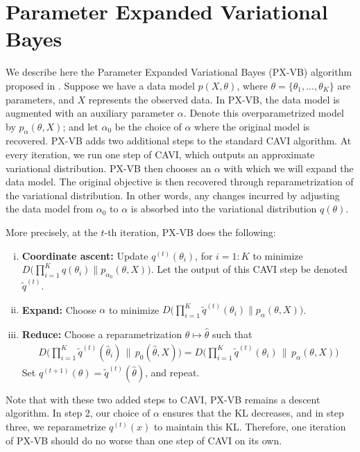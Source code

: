 \documentclass{article}
\begin{document}
\section{Parameter Expanded Variational Bayes}
\label{PXVB}

We describe here the Parameter Expanded Variational Bayes (PX-VB) algorithm proposed in \cite{Qi}. Suppose we have a data model $p(X,\theta)$, where $\theta =  \{\theta_1, ... , \theta_K\}$ are parameters, and $X$ represents the observed data. In PX-VB, the data model is augmented with an auxiliary parameter $\alpha$. Denote this overparametrized model by $p_\alpha(\theta, X)$; and let $\alpha_0$ be the choice of $\alpha$ where the original model is recovered. PX-VB adds two additional steps to the standard CAVI algorithm. At every iteration, we run one step of CAVI, which outputs an approximate variational distribution. PX-VB then chooses an $\alpha$ with which we will expand the data model. The original objective is then recovered through reparametrization of the variational distribution. In other words, any changes incurred by adjusting the data model from $\alpha_0$ to $\alpha$ is absorbed into the variational distribution $q(\theta)$. 



More precisely, at the $t$-th iteration, PX-VB does the following: 
\begin{enumerate}[(i)]
\item {\bf Coordinate ascent:} Update $q^{(t)}(\theta_i)$, for $i=1:K$ to minimize $D\big( \prod_{i=1}^K q(\theta_i) \| p_{\alpha_0}(\theta, X) \big)$. Let the output of this CAVI step be denoted $\tilde q^{(t)}$. 
\item {\bf Expand:} Choose $\alpha$ to minimize $D\big( \prod_{i=1}^K \tilde q^{(t)}(\theta_i) \| p_\alpha(\theta, X) \big)$.
\item {\bf Reduce:} Choose a reparametrization $\theta \mapsto \hat\theta$ such that
\begin{align*}
D\Big( \prod_{i=1}^K \tilde q^{(t)}(\hat\theta_i) \,\big\|\, p_{0}(\hat\theta, X) \Big) = D\Big( \prod_{i=1}^K \tilde q^{(t)}(\theta_i) \,\big\|\, p_\alpha(\theta, X) \Big)
\end{align*}
Set $q^{(t+1)}(\theta) = \tilde q^{(t)}(\hat\theta)$, and repeat. 
\end{enumerate}


Note that with these two added steps to CAVI, PX-VB remains a descent algorithm. In step 2, our choice of $\alpha$ ensures that the KL decreases, and in step three, we reparametrize $q^{(t)}(x)$ to maintain this KL. Therefore, one iteration of PX-VB should do no worse than one step of CAVI on its own. 
\end{document}
